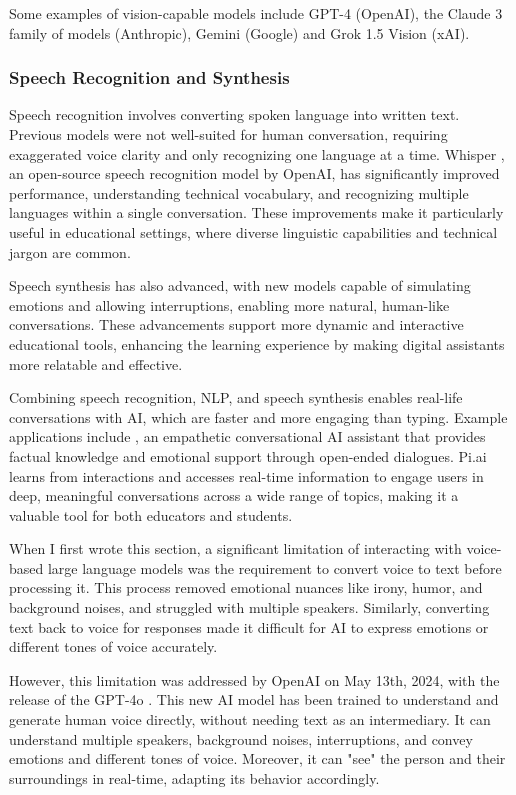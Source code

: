 \documentclass{article}
\begin{document}
Some examples of vision-capable models include GPT-4 (OpenAI), the Claude 3 family of models (Anthropic), Gemini (Google) and Grok 1.5 Vision (xAI).

\subsubsection{Speech Recognition and Synthesis}
Speech recognition involves converting spoken language into written text.
Previous models were not well-suited for human conversation,
requiring exaggerated voice clarity and only recognizing one
language at a time. Whisper \cite{openai2024whisper},
an open-source speech recognition model by OpenAI,
has significantly improved performance, understanding
technical vocabulary, and recognizing multiple languages
within a single conversation. These improvements make it
particularly useful in educational settings, where diverse linguistic
capabilities and technical jargon are common.

Speech synthesis has also advanced, with new models capable
of simulating emotions and allowing interruptions, enabling
more natural, human-like conversations. These advancements
support more dynamic and interactive educational tools,
enhancing the learning experience by making digital assistants
more relatable and effective.

Combining speech recognition, NLP, and speech synthesis
enables real-life conversations with AI, which are faster
and more engaging than typing. Example applications include \cite[Pi.ai]{pi_ai},
an empathetic conversational AI assistant that provides factual knowledge
and emotional support through open-ended dialogues.
Pi.ai learns from interactions and accesses real-time
information to engage users in deep, meaningful conversations across
a wide range of topics, making it a valuable tool
for both educators and students.

When I first wrote this section, a significant limitation
of interacting with voice-based large language models
was the requirement to convert voice to text before
processing it. This process removed emotional nuances like irony,
humor, and background noises, and struggled with multiple speakers.
Similarly, converting text back to voice for responses made it
difficult for AI to express emotions or different tones of voice accurately.

However, this limitation was addressed by OpenAI on May 13th, 2024,
with the release of the GPT-4o \cite{openai_gpt4o}. This
new AI model has been trained to understand and generate
human voice directly, without needing text as an intermediary.
It can understand multiple speakers, background noises, interruptions,
and convey emotions and different tones of voice.
Moreover, it can "see" the person and their surroundings
in real-time, adapting its behavior accordingly.
\end{document}
